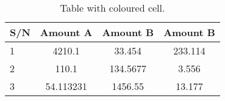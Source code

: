 \documentclass{article}
\begin{document}
	\begin{table}[h!]
		\begin{center}
			\caption{Table with coloured cell.}
			\label{tab:table1}
			\begin{tabular}{|l|c|c|c|} %
				\hline
				\textbf{S/N} & \textbf{Amount A} & \textbf{Amount B} &\textbf{Amount B}\\
				\hline
				\cellcolor{blue!25}1 & 4210.1 & 33.454 & 233.114\\
				\cellcolor{green!20}2 & 110.1 & 134.5677 & 3.556\\		
				\cellcolor{red!35}3 & 54.113231 &1456.55 & 13.177\\
				\hline
			\end{tabular}
		\end{center}
	\end{table}
\end{document}
